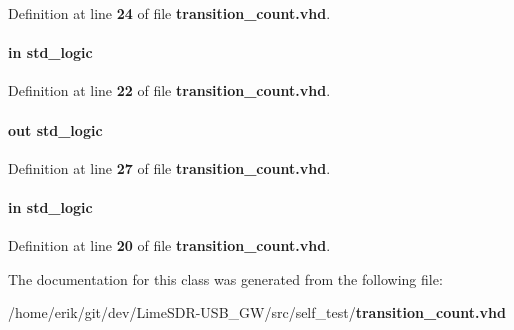 Definition at line {\bf 24} of file {\bf transition\+\_\+count.\+vhd}.

\paragraph[{test\+\_\+en}]{ {\bfseries \textcolor{keywordflow}{in}\textcolor{vhdlchar}{ }} {\bfseries \textcolor{comment}{std\+\_\+logic}\textcolor{vhdlchar}{ }} \hspace{0.3cm}{\ttfamily [Port]}}\label{classtransition__count_a4b3cbe4c35cbc762687ca6f1f8d45f6f}


Definition at line {\bf 22} of file {\bf transition\+\_\+count.\+vhd}.

\paragraph[{test\+\_\+pass\+\_\+fail}]{ {\bfseries \textcolor{keywordflow}{out}\textcolor{vhdlchar}{ }} {\bfseries \textcolor{comment}{std\+\_\+logic}\textcolor{vhdlchar}{ }} \hspace{0.3cm}{\ttfamily [Port]}}\label{classtransition__count_a1bba60b74f318713ff472903c86e248c}


Definition at line {\bf 27} of file {\bf transition\+\_\+count.\+vhd}.

\paragraph[{trans\+\_\+wire}]{ {\bfseries \textcolor{keywordflow}{in}\textcolor{vhdlchar}{ }} {\bfseries \textcolor{comment}{std\+\_\+logic}\textcolor{vhdlchar}{ }} \hspace{0.3cm}{\ttfamily [Port]}}\label{classtransition__count_a3b6ac8976e3fab4522cd8f90b03aa295}


Definition at line {\bf 20} of file {\bf transition\+\_\+count.\+vhd}.



The documentation for this class was generated from the following file\+:\begin{DoxyCompactItemize}
\item 
/home/erik/git/dev/\+Lime\+S\+D\+R-\/\+U\+S\+B\+\_\+\+G\+W/src/self\+\_\+test/{\bf transition\+\_\+count.\+vhd}\end{DoxyCompactItemize}
